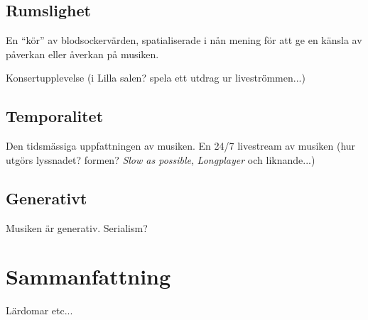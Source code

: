 \documentclass[11pt, twoside, a4paper]{article}
\begin{document}
\subsection{Rumslighet}
En \enquote{kör} av blodsockervärden, spatialiserade i nån mening för att ge en känsla av påverkan eller åverkan på musiken. 

Konsertupplevelse (i Lilla salen? spela ett utdrag ur liveströmmen...)

\subsection{Temporalitet}
Den tidsmässiga uppfattningen av musiken. En 24/7 livestream av musiken (hur utgörs lyssnadet? formen? \emph{Slow as possible}, \emph{Longplayer} och liknande...)

\subsection{Generativt}
Musiken är generativ. Serialism?

\section{Sammanfattning}
Lärdomar etc...



\end{document}
